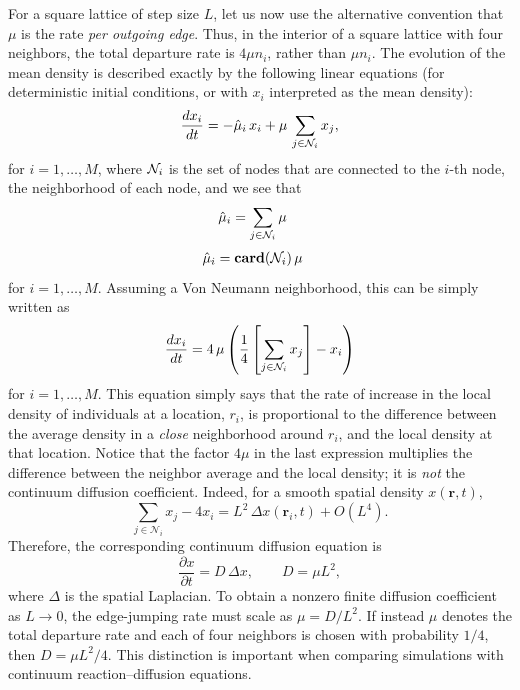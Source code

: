 For a square lattice of step size $L$, let us now use the alternative convention that $\mu$ is the rate \emph{per outgoing edge}. Thus, in the interior of a square lattice with four neighbors, the total departure rate is $4\mu n_i$, rather than $\mu n_i$. The evolution of the mean density is described exactly by the following linear equations (for deterministic initial conditions, or with $x_i$ interpreted as the mean density):
\begin{equation}
\frac{dx_i}{dt} = -\hat{\mu}_i\,x_i + \mu \, \sum_{j \in {\cal N}_i} x_j, 
\end{equation}
for $i=1, \dots, M$, where ${\cal N}_i$ is the set of nodes that are connected to the $i$-th node, the neighborhood of each node, and we see that 
\begin{align*}
\hat{\mu}_i   &= \sum_{j \in {\cal N}_i} \mu
\end{align*} 
\begin{align*}
\hat{\mu}_i   &= \mathbf{card}({\cal N}_i)\, \mu
\end{align*} 
for $i=1, \dots, M$. Assuming a Von Neumann neighborhood, this can be simply written as
\begin{equation}
\frac{dx_i}{dt} = 4\,\mu \left(\frac{1}{4} \left[\sum_{j \in {\cal N}_i} x_j\right] - x_i\right)
\end{equation}
for $i=1, \dots, M$. This equation simply says that the rate of increase in the local density of individuals at a location, $r_i$, is proportional to the difference between the average density in a \emph{close} neighborhood around $r_i$, and the local density at that location. Notice that the factor $4\mu$ in the last expression multiplies the difference between the neighbor average and the local density; it is \emph{not} the continuum diffusion coefficient. Indeed, for a smooth spatial density $x(\mathbf r,t)$,
\[
\sum_{j\in\mathcal N_i}x_j-4x_i
  =L^2\,\Delta x(\mathbf r_i,t)+O(L^4).
\]
Therefore, the corresponding continuum diffusion equation is
\begin{equation}
\frac{\partial x}{\partial t} = D\,\Delta x, \qquad D=\mu L^2,
\label{eq:Diffusion}
\end{equation}
where $\Delta$ is the spatial Laplacian. To obtain a nonzero finite diffusion coefficient as $L\to0$, the edge-jumping rate must scale as $\mu=D/L^2$. If instead $\mu$ denotes the total departure rate and each of four neighbors is chosen with probability $1/4$, then $D=\mu L^2/4$. This distinction is important when comparing simulations with continuum reaction--diffusion equations.  
\smallskip

